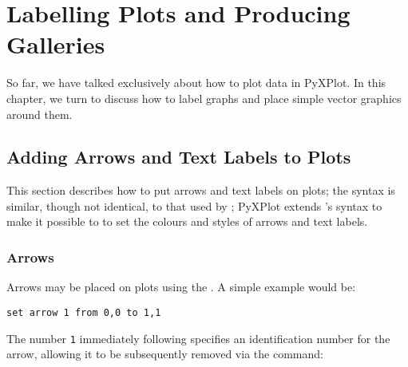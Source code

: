 %
%
%
%
%



\chapter{Labelling Plots and Producing Galleries}

So far, we have talked exclusively about how to plot data in PyXPlot. In this
chapter, we turn to discuss how to label graphs and place simple vector
graphics around them.

\section{Adding Arrows and Text Labels to Plots}

This section describes how to put arrows and text labels on plots; the syntax
is similar, though not identical, to that used by \gnuplot; PyXPlot extends
\gnuplot's syntax to make it possible to to set the colours and styles of
arrows and text labels.

\subsection{Arrows}

\label{set_arrow} Arrows may be placed on plots using the
. A simple example would be:

\begin{verbatim}
set arrow 1 from 0,0 to 1,1
\end{verbatim}

\noindent The number {\tt 1} immediately following 
specifies an identification number for the arrow, allowing it to be
subsequently removed via the command:

